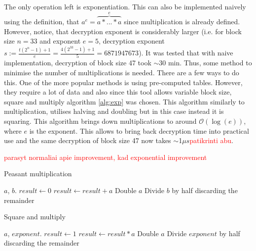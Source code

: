 \documentclass{Resources/UoBLab1}
\theoremstyle{definition}
\begin{document}
The only operation left is exponentiation. This can also be implemented naively using the definition, that $a^e = \overbrace{a * ... * a}^e$ since multiplication is already defined. However, notice, that decryption exponent is considerably larger (i.e. for block size $n = 33$ and exponent $e = 5$, decryption exponent $s := \frac{t(2^n-1)+1}{e} = \frac{4(2^{33}-1)+1}{5} = 6871947673$). It was tested that with naive implementation, decryption of block size 47 took $\sim$30 min. Thus, some method to minimise the number of multiplications is needed. There are a few ways to do this. One of the more popular methods is using pre-computed tables. However, they require a lot of data and also since this tool allows variable block size, square and multiply algorithm \ref{alg:exp} was chosen. This algorithm similarly to multiplication, utilises halving and doubling but in this case instead it is squaring. This algorithm brings down multiplications to around $\mathcal{O}(\log(e))$, where $e$ is the exponent. This allows to bring back decryption time into practical use and the same decryption of block size 47 now takes $\sim$1$\mu s$\textcolor{red}{patikrinti abu}.

\textcolor{red}{parasyt normaliai apie improvement, kad exponential improvement}


\begin{minipage}{0.46\textwidth}
\begin{algorithm}[H]
    \caption{Peasant multiplication}\label{alg:mult}
    \begin{algorithmic}
        \Require $a$, $b$.
        \State $result \gets 0$
                \State $result \gets result + a$
            \EndIf
            \State Double $a$
            \State Divide $b$ by half discarding the remainder
        \EndWhile
    \end{algorithmic}
\end{algorithm}
\end{minipage}
\hfill
\begin{minipage}{0.46\textwidth}
\begin{algorithm}[H]
    \caption{Square and multiply}\label{alg:exp}
    \begin{algorithmic}
        \Require $a$, $exponent$.
        \State $result \gets 1$
                \State $result \gets result * a$
            \EndIf
            \State Double $a$
            \State Divide $exponent$ by half discarding the remainder
        \EndWhile
    \end{algorithmic}
\end{algorithm}
\end{minipage}
\end{document}
